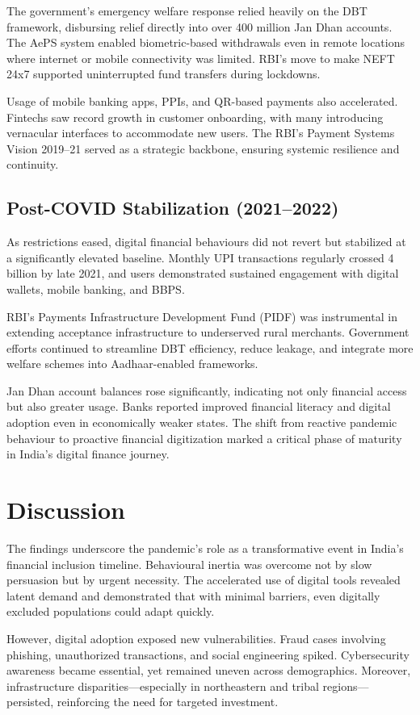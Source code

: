 \documentclass[conference]{IEEEtran}
\begin{document}
The government’s emergency welfare response relied heavily on the DBT framework, disbursing relief directly into over 400 million Jan Dhan accounts. The AePS system enabled biometric-based withdrawals even in remote locations where internet or mobile connectivity was limited. RBI’s move to make NEFT 24x7 supported uninterrupted fund transfers during lockdowns.

Usage of mobile banking apps, PPIs, and QR-based payments also accelerated. Fintechs saw record growth in customer onboarding, with many introducing vernacular interfaces to accommodate new users. The RBI's Payment Systems Vision 2019–21 served as a strategic backbone, ensuring systemic resilience and continuity.

\subsection{Post-COVID Stabilization (2021--2022)}
As restrictions eased, digital financial behaviours did not revert but stabilized at a significantly elevated baseline. Monthly UPI transactions regularly crossed 4 billion by late 2021, and users demonstrated sustained engagement with digital wallets, mobile banking, and BBPS.

RBI’s Payments Infrastructure Development Fund (PIDF) was instrumental in extending acceptance infrastructure to underserved rural merchants. Government efforts continued to streamline DBT efficiency, reduce leakage, and integrate more welfare schemes into Aadhaar-enabled frameworks.

Jan Dhan account balances rose significantly, indicating not only financial access but also greater usage. Banks reported improved financial literacy and digital adoption even in economically weaker states. The shift from reactive pandemic behaviour to proactive financial digitization marked a critical phase of maturity in India’s digital finance journey.

\section{Discussion}
The findings underscore the pandemic’s role as a transformative event in India’s financial inclusion timeline. Behavioural inertia was overcome not by slow persuasion but by urgent necessity. The accelerated use of digital tools revealed latent demand and demonstrated that with minimal barriers, even digitally excluded populations could adapt quickly.

However, digital adoption exposed new vulnerabilities. Fraud cases involving phishing, unauthorized transactions, and social engineering spiked. Cybersecurity awareness became essential, yet remained uneven across demographics. Moreover, infrastructure disparities—especially in northeastern and tribal regions—persisted, reinforcing the need for targeted investment.
\end{document}
